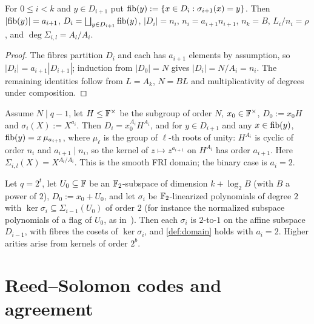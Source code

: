 \begin{lemma}[Fibres]\label{lem:fibres}
For $0\le i<k$ and $y\in D_{i+1}$ put $\mathrm{fib}(y):=\{x\in D_i:\sigma_{i+1}(x)=y\}$. Then
$|\mathrm{fib}(y)|=a_{i+1}$, $D_i=\bigsqcup_{y\in D_{i+1}}\mathrm{fib}(y)$, $|D_i|=n_i$, $n_i=a_{i+1}n_{i+1}$,
$n_k=B$, $L_i/n_i=\rho$, and $\deg\Sigma_{i,l}=A_l/A_i$.
\end{lemma}

\begin{proof}
The fibres partition $D_i$ and each has $a_{i+1}$ elements by assumption, so
$|D_i|=a_{i+1}|D_{i+1}|$; induction from $|D_0|=N$ gives $|D_i|=N/A_i=n_i$. The remaining
identities follow from $L=A_k$, $N=BL$ and multiplicativity of degrees under composition.
\end{proof}

\begin{example}\label{ex:multiplicative}
Assume $N\mid q-1$, let $H\le\mathbb{F}^\times$ be the subgroup of order $N$, $x_0\in\mathbb{F}^\times$,
$D_0:=x_0H$ and $\sigma_i(X):=X^{a_i}$. Then $D_i=x_0^{A_i}H^{A_i}$, and for $y\in D_{i+1}$
and any $x\in\mathrm{fib}(y)$, $\mathrm{fib}(y)=x\,\mu_{a_{i+1}}$, where $\mu_\ell$ is the group of
$\ell$-th roots of unity: $H^{A_i}$ is cyclic of order $n_i$ and $a_{i+1}\mid n_i$, so the
kernel of $z\mapsto z^{a_{i+1}}$ on $H^{A_i}$ has order $a_{i+1}$. Here
$\Sigma_{i,l}(X)=X^{A_l/A_i}$. This is the smooth FRI domain; the binary case is $a_i=2$.
\end{example}

\begin{example}\label{ex:additive}
Let $q=2^t$, let $U_0\subseteq\mathbb{F}$ be an $\mathbb{F}_2$-subspace of dimension $k+\log_2B$ (with
$B$ a power of $2$), $D_0:=x_0+U_0$, and let $\sigma_{i}$ be $\mathbb{F}_2$-linearized polynomials
of degree $2$ with $\ker\sigma_{i}\subseteq\Sigma_{i-1}(U_0)$ of order $2$ (for instance
the normalized subspace polynomials of a flag of $U_0$, as in~\cite{LCH14,DP24}). Then
each $\sigma_i$ is $2$-to-$1$ on the affine subspace $D_{i-1}$, with fibres the cosets of
$\ker\sigma_i$, and \cref{def:domain} holds with $a_i=2$. Higher arities arise from
kernels of order $2^b$.
\end{example}

\section{Reed--Solomon codes and agreement}

